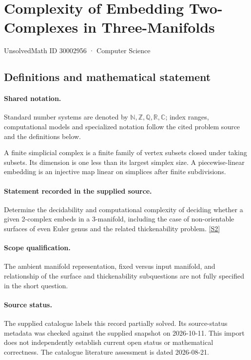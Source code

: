 \documentclass[11pt]{article}
\newcommand{\sref}[2]{\hyperlink{source:#1:#2}{[S#2]}}
\begin{document}
\setcounter{section}{30002955}
\section{Complexity of Embedding Two-Complexes in Three-Manifolds}\label{30002956}
{\small\sffamily UnsolvedMath ID 30002956 · Computer Science}
\subsection{Definitions and mathematical statement}

\paragraph{Shared notation.}Standard number systems are denoted by $\mathbb N,\mathbb Z,\mathbb Q,\mathbb R,\mathbb C$; index ranges, computational models and specialized notation follow the cited problem source and the definitions below.


A finite simplicial complex is a finite family of vertex subsets closed under taking subsets. Its dimension is one less than its largest simplex size. A piecewise-linear embedding is an injective map linear on simplices after finite subdivisions.
\paragraph{Statement recorded in the supplied source.}
Determine the decidability and computational complexity of deciding whether a given 2-complex embeds in a 3-manifold, including the case of non-orientable surfaces of even Euler genus and the related thickenability problem. \sref{30002956}{2}
\paragraph{Scope qualification.}
The ambient manifold representation, fixed versus input manifold, and relationship of the surface and thickenability subquestions are not fully specified in the short question.
\paragraph{Source status.}
The supplied catalogue labels this record partially solved. Its source-status metadata was checked against the supplied snapshot on 2026-10-11. This import does not independently establish current open status or mathematical correctness. The catalogue literature assessment is dated 2026-08-21.
\end{document}
